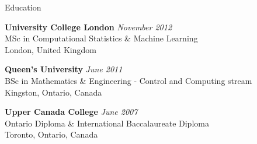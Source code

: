 \documentclass{resume}
\begin{document}

\begin{rSection}{Education}

{\bf University College London} \hfill {\em November 2012} \\ 
MSc in Computational Statistics \& Machine Learning \\
London, United Kingdom

{\bf Queen's University} \hfill {\em June 2011} \\ 
BSc in Mathematics \& Engineering - Control and Computing stream \\
Kingston, Ontario, Canada

{\bf Upper Canada College} \hfill {\em June 2007} \\ 
Ontario Diploma \& International Baccalaureate Diploma \\
Toronto, Ontario, Canada\\ 

\end{rSection}

\end{document}
